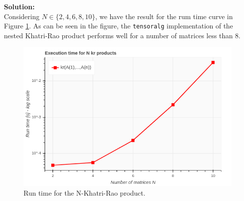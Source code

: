 \documentclass[12pt]{article}
\begin{document}
\noindent \textbf{Solution:}\\

Considering $N \in \{2, 4, 6, 8, 10\}$, we have the result for the rum time 
curve in Figure \ref{p2}. As can be seen in the figure, the \texttt{tensoralg} 
implementation of the nested Khatri-Rao product performs well for a number of 
matrices less than $8$.

\begin{figure}[H]
    \centering 
    \includegraphics[width=0.55\linewidth]{figs/p2.png}
    \caption{Run time for the N-Khatri-Rao product.}
    \label{p2}
\end{figure}
\end{document}
